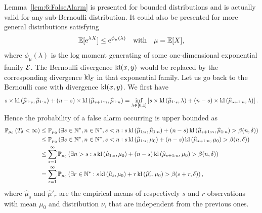 \begin{smallproof}
Lemma~\ref{lem:6:FalseAlarm} is presented for bounded distributions and is actually valid for any sub-Bernoulli distribution. It could also be presented for more general distributions satisfying
\begin{equation}
    \mathbb{E}[\mathrm{e}^{\lambda X} ] \leq \mathrm{e}^{\phi_\mu(\lambda)} \ \ \text{ with } \ \ \mu=\mathbb{E}[X]\label{def:6:subExpo},
\end{equation}
where $\phi_\mu(\lambda)$ is the $\mathrm{log}$ moment generating of some one-dimensional exponential family $\mathcal{E}$. The Bernoulli divergence $\mathrm{kl}(x,y)$ would be replaced by the corresponding divergence $\mathrm{kl}_{\mathcal{E}}$ in that exponential family.
%
Let us go back to the Bernoulli case with divergence $\mathrm{kl}(x,y)$.
We first have
\[s \times \mathrm{kl}\left(\widehat{\mu}_{1:s},\widehat{\mu}_{1:n}\right) + (n-s) \times \mathrm{kl}\left(\widehat{\mu}_{s+1:n},\widehat{\mu}_{1:n}\right) = \inf_{\lambda \in [0,1]}\left[s \times \mathrm{kl}\left(\widehat{\mu}_{1:s},\lambda\right) + (n-s) \times \mathrm{kl}\left(\widehat{\mu}_{s+1:n},\lambda\right)\right].\]
Hence the probability of a false alarm occurring is upper bounded as
%
\begin{align*}
    \mathbb{P}_{\mu_0}\left(T_{\delta} < \infty\right) & \leq \mathbb{P}_{\mu_0}\left(\exists s \in \mathbb{N}^*, n \in \mathbb{N}^*, s < n:  s \, \mathrm{kl}\left(\widehat{\mu}_{1:s},\widehat{\mu}_{1:n}\right) + (n-s) \, \mathrm{kl}\left(\widehat{\mu}_{s+1:n},\widehat{\mu}_{1:n}\right) > \beta(n,\delta)\right)\\
    & \leq \mathbb{P}_{\mu_0}\left(\exists s \in \mathbb{N}^*, n \in \mathbb{N}^*, s < n:  s \, \mathrm{kl}\left(\widehat{\mu}_{1:s},\mu_0\right) + (n-s) \, \mathrm{kl}\left(\widehat{\mu}_{s+1:n},\mu_0\right) > \beta(n,\delta)\right) \\
    & \leq \sum_{s =1}^{\infty} \mathbb{P}_{\mu_0}\left(\exists n > s:  s \, \mathrm{kl}\left(\widehat{\mu}_{1:s},\mu_0\right) + (n-s) \, \mathrm{kl}\left(\widehat{\mu}_{s+1:n},\mu_0\right) > \beta(n,\delta)\right)\\
    & =   \sum_{s =1}^{\infty} \mathbb{P}_{\mu_0}\left(\exists r \in \mathbb{N}^*:  s \, \mathrm{kl}\left(\widehat{\mu}_{s},\mu_0\right) + r \, \mathrm{kl}\left(\widehat{\mu}'_{r},\mu_0\right) > \beta(s+r,\delta)\right),
\end{align*}
%
where $\widehat{\mu}_{s}$ and $\widehat{\mu}'_{r}$ are the empirical means of respectively $s$ and $r$ \iid{} observations with mean $\mu_0$ and distribution $\nu$, that are independent from the previous ones.

\end{smallproof}
